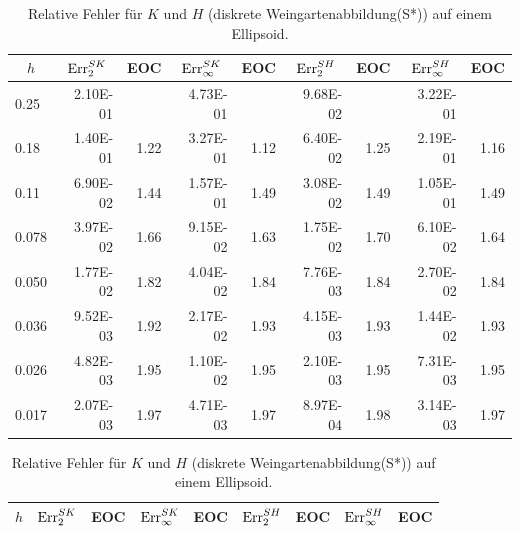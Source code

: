    \begin{table}[htbp]
    \centering
      \begin{tabular}{|l|r|r|r|r|r|r|r|r|}
      \hline
      \multicolumn{1}{|c|}{\rule{0pt}{11pt}\( h \)} & \multicolumn{1}{c|}{\( \text{Err}_{2}^{SK} \)} & \multicolumn{1}{c|}{EOC} & 
           \multicolumn{1}{c|}{\( \text{Err}_{\infty}^{SK} \)} & \multicolumn{1}{c|}{EOC} & \multicolumn{1}{c|}{\( \text{Err}_{2}^{SH} \)} &
           \multicolumn{1}{c|}{EOC} & \multicolumn{1}{c|}{\( \text{Err}_{\infty}^{SH} \)} & \multicolumn{1}{c|}{EOC} \\ \hline
           0.25 & 2.10E-01 & \multicolumn{1}{l|}{} & 4.73E-01 & \multicolumn{1}{l|}{} & 9.68E-02 & \multicolumn{1}{l|}{} & 3.22E-01 & \multicolumn{1}{l|}{} \\ \hline
            0.18 & 1.40E-01 & 1.22 & 3.27E-01 & 1.12 & 6.40E-02 & 1.25 & 2.19E-01 & 1.16 \\ \hline
            0.11 & 6.90E-02 & 1.44 & 1.57E-01 & 1.49 & 3.08E-02 & 1.49 & 1.05E-01 & 1.49 \\ \hline
            0.078 & 3.97E-02 & 1.66 & 9.15E-02 & 1.63 & 1.75E-02 & 1.70 & 6.10E-02 & 1.64 \\ \hline
            0.050 & 1.77E-02 & 1.82 & 4.04E-02 & 1.84 & 7.76E-03 & 1.84 & 2.70E-02 & 1.84 \\ \hline
            0.036 & 9.52E-03 & 1.92 & 2.17E-02 & 1.93 & 4.15E-03 & 1.93 & 1.44E-02 & 1.93 \\ \hline
            0.026 & 4.82E-03 & 1.95 & 1.10E-02 & 1.95 & 2.10E-03 & 1.95 & 7.31E-03 & 1.95 \\ \hline
            0.017 & 2.07E-03 & 1.97 & 4.71E-03 & 1.97 & 8.97E-04 & 1.98 & 3.14E-03 & 1.97 \\ \hline
      \end{tabular}
      \caption[Weingarten auf einem Ellipsoid (S*)]{Relative Fehler für \( K \) und \( H \) (diskrete Weingartenabbildung(S*)) auf einem Ellipsoid.}
      \label{tabHeineCWeingarten}
      \vspace{10pt}
    \centering
      \begin{tabular}{|l|r|r|r|r|r|r|r|r|}
      \hline
      \multicolumn{1}{|c|}{\rule{0pt}{11pt}\( h \)} & \multicolumn{1}{c|}{\( \text{Err}_{2}^{SK} \)} & \multicolumn{1}{c|}{EOC} & 
           \multicolumn{1}{c|}{\( \text{Err}_{\infty}^{SK} \)} & \multicolumn{1}{c|}{EOC} & \multicolumn{1}{c|}{\( \text{Err}_{2}^{SH} \)} &
           \multicolumn{1}{c|}{EOC} & \multicolumn{1}{c|}{\( \text{Err}_{\infty}^{SH} \)} & \multicolumn{1}{c|}{EOC} \\ \hline

\end{tabular}
\end{table}
